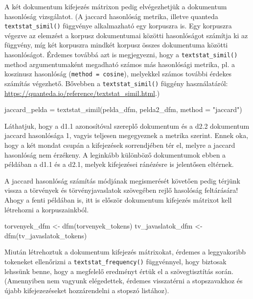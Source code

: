 \documentclass[
]{book}
\newenvironment{Shaded}{\begin{snugshade}}{\end{snugshade}}
\newcommand{\AttributeTok}[1]{\textcolor[rgb]{0.77,0.63,0.00}{#1}}
\newcommand{\FunctionTok}[1]{\textcolor[rgb]{0.00,0.00,0.00}{#1}}
\newcommand{\NormalTok}[1]{#1}
\newcommand{\OtherTok}[1]{\textcolor[rgb]{0.56,0.35,0.01}{#1}}
\newcommand{\StringTok}[1]{\textcolor[rgb]{0.31,0.60,0.02}{#1}}
\begin{document}
A két dokumentum kifejezés mátrixon pedig elvégezhetjük a dokumentum
hasonlóság vizsgálatot. (A jaccard hasonlóság metrika, illetve quanteda
\texttt{textstat\_simil()} függvénye alkalmazható egy korpuszra is. Egy
korpuszra végezve az elemzést a korpusz dokumentumai közötti
hasonlóságot számítja ki az függvény, míg két korpuszra mindkét korpusz
összes dokumentuma közötti hasonlóságot. Érdemes továbbá azt is
megjegyezni, hogy a \texttt{textstat\_simil()} method argumentumaként
megadható számos más hasonlósági metrika, pl. a koszinusz hasonlóság
(\texttt{method\ =\ \textquotesingle{}cosine\textquotesingle{}}),
melyekkel számos további érdekes számítás végezhető. Bővebben a
\texttt{textstat\_simil()} függény használatáról:
\url{https://quanteda.io/reference/textstat_simil.html}.)

\begin{Shaded}
\begin{Highlighting}[]
\NormalTok{jaccard\_pelda }\OtherTok{=} \FunctionTok{textstat\_simil}\NormalTok{(pelda\_dfm, pelda2\_dfm, }\AttributeTok{method =} \StringTok{"jaccard"}\NormalTok{)}
\end{Highlighting}
\end{Shaded}

Láthatjuk, hogy a d1.1 azonosítóval szereplő dokumentum és a d2.2
dokumentum jaccard hasonlósága 1, vagyis teljesen megegyeznek a metrika
szerint. Ennek oka, hogy a két mondat csupán a kifejezések sorrendjében
tér el, melyre a jaccard hasonlóság nem érzékeny. A leginkább különböző
dokumentumok ebben a példában a d1.1 és a d2.1, melyek kifejezései
ránézésre is jelentősen eltérnek.

A jaccard hasonlóság számítás módjának megismerését követően pedig
térjünk vissza a törvények és törvényjavaslatok szövegében rejlő
hasolóság feltárására! Ahogy a fenti példában is, itt is először
dokumentum kifejezés mátrixot kell létrehozni a korpuszainkból.

\begin{Shaded}
\begin{Highlighting}[]
\NormalTok{torvenyek\_dfm }\OtherTok{\textless{}{-}} \FunctionTok{dfm}\NormalTok{(torvenyek\_tokens)}
\NormalTok{tv\_javaslatok\_dfm }\OtherTok{\textless{}{-}} \FunctionTok{dfm}\NormalTok{(tv\_javaslatok\_tokens) }
\end{Highlighting}
\end{Shaded}

Miután létrehoztuk a dokumentum kifejezés mátrixokat, érdemes a
leggyakoribb tokeneket ellenőrizni a \texttt{textstat\_frequency()}
függvénnyel, hogy biztosak lehssünk benne, hogy a megfelelő eredményt
értük el a szövegtisztítás során. (Amennyiben nem vagyunk elégedettek,
érdemes visszatérni a stopszavakhoz és újabb kifejezezéseket
hozzárendelni a stopszó listához).
\end{document}
